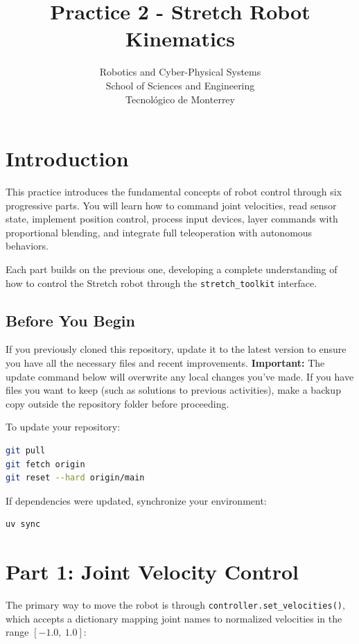 \documentclass[11pt,a4paper]{article}
\title{\textbf{Practice 2 - Stretch Robot Kinematics}}
\author{
    Robotics and Cyber-Physical Systems \\
    School of Sciences and Engineering \\
    Tecnol\'ogico de Monterrey
}
\date{}
\begin{document}
\maketitle

\section*{Introduction}

This practice introduces the fundamental concepts of robot control through six progressive parts. You will learn how to command joint velocities, read sensor state, implement position control, process input devices, layer commands with proportional blending, and integrate full teleoperation with autonomous behaviors.

Each part builds on the previous one, developing a complete understanding of how to control the Stretch robot through the \texttt{stretch\_toolkit} interface.

\subsection*{Before You Begin}

If you previously cloned this repository, update it to the latest version to ensure you have all the necessary files and recent improvements. \textbf{Important:} The update command below will overwrite any local changes you've made. If you have files you want to keep (such as solutions to previous activities), make a backup copy outside the repository folder before proceeding.

To update your repository:

\begin{lstlisting}[language=bash]
git pull
git fetch origin
git reset --hard origin/main
\end{lstlisting}

If dependencies were updated, synchronize your environment:

\begin{lstlisting}[language=bash]
uv sync
\end{lstlisting}

\section{Part 1: Joint Velocity Control}

The primary way to move the robot is through \texttt{controller.set\_velocities()}, which accepts a dictionary mapping joint names to normalized velocities in the range $[-1.0,\ 1.0]$:
\end{document}
